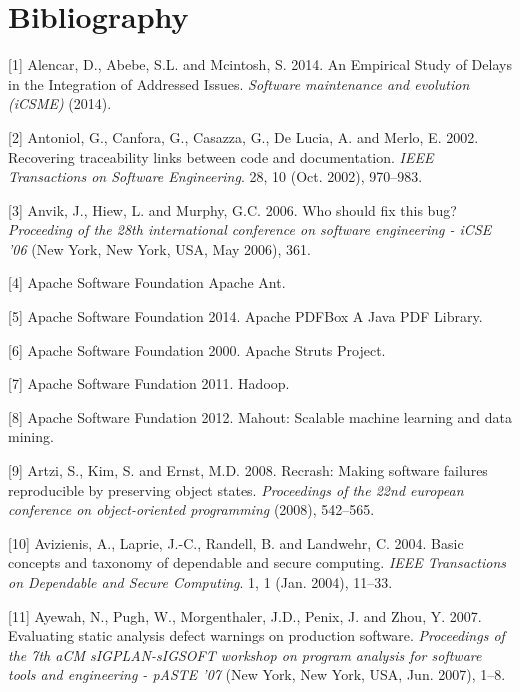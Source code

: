 \documentclass[12pt]{report}
\begin{document}
\section*{Bibliography}

\setlength{\parindent}{0pt}

\hypertarget{refs}{}
\hypertarget{ref-Alencar2014}{}
{[}1{]} Alencar, D., Abebe, S.L. and Mcintosh, S. 2014. An Empirical
Study of Delays in the Integration of Addressed Issues. \emph{Software
maintenance and evolution (iCSME)} (2014).

\hypertarget{ref-Antoniol2002}{}
{[}2{]} Antoniol, G., Canfora, G., Casazza, G., De Lucia, A. and Merlo,
E. 2002. Recovering traceability links between code and documentation.
\emph{IEEE Transactions on Software Engineering}. 28, 10 (Oct. 2002),
970--983.

\hypertarget{ref-Anvik2006}{}
{[}3{]} Anvik, J., Hiew, L. and Murphy, G.C. 2006. Who should fix this
bug? \emph{Proceeding of the 28th international conference on software
engineering - iCSE '06} (New York, New York, USA, May 2006), 361.

\hypertarget{ref-ApacheSoftwareFoundation}{}
{[}4{]} Apache Software Foundation Apache Ant.

\hypertarget{ref-ApacheSoftwareFoundation2014}{}
{[}5{]} Apache Software Foundation 2014. Apache PDFBox \textbar{} A Java
PDF Library.

\hypertarget{ref-ApacheSoftwareFoundation2000}{}
{[}6{]} Apache Software Foundation 2000. Apache Struts Project.

\hypertarget{ref-hadoop2011hadoop}{}
{[}7{]} Apache Software Fundation 2011. Hadoop.

\hypertarget{ref-mahout2012scalable}{}
{[}8{]} Apache Software Fundation 2012. Mahout: Scalable machine
learning and data mining.

\hypertarget{ref-Artzi2008}{}
{[}9{]} Artzi, S., Kim, S. and Ernst, M.D. 2008. Recrash: Making
software failures reproducible by preserving object states.
\emph{Proceedings of the 22nd european conference on object-oriented
programming} (2008), 542--565.

\hypertarget{ref-Avizienis2004}{}
{[}10{]} Avizienis, A., Laprie, J.-C., Randell, B. and Landwehr, C.
2004. Basic concepts and taxonomy of dependable and secure computing.
\emph{IEEE Transactions on Dependable and Secure Computing}. 1, 1 (Jan.
2004), 11--33.

\hypertarget{ref-Ayewah2007}{}
{[}11{]} Ayewah, N., Pugh, W., Morgenthaler, J.D., Penix, J. and Zhou,
Y. 2007. Evaluating static analysis defect warnings on production
software. \emph{Proceedings of the 7th aCM sIGPLAN-sIGSOFT workshop on
program analysis for software tools and engineering - pASTE '07} (New
York, New York, USA, Jun. 2007), 1--8.
\end{document}
